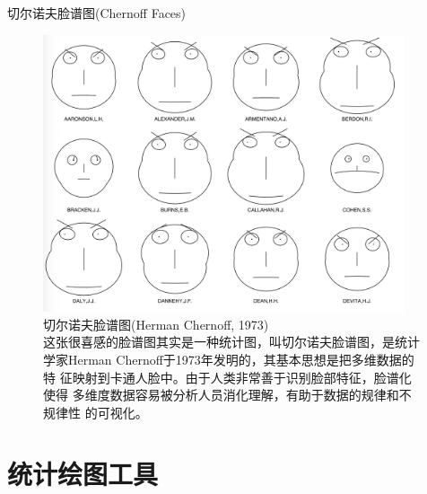 \documentclass{beamerthemeMono}
\begin{document}
\begin{frame}{\subsecname}{切尔诺夫脸谱图(Chernoff Faces)}

  \begin{figure}
    \begin{columns}
      \begin{column}{.6\textwidth}
        \includegraphics[width=\columnwidth]{切尔诺夫脸谱图.jpg}
      \end{column}

      \begin{column}{.35\textwidth}
        \centering
        \caption{切尔诺夫脸谱图(Herman Chernoff, 1973)\\
          这张很喜感的脸谱图其实是一种统计图，叫切尔诺夫脸谱图，是统计
          学家Herman Chernoff于1973年发明的，其基本思想是把多维数据的特
          征映射到卡通人脸中。由于人类非常善于识别脸部特征，脸谱化使得
          多维度数据容易被分析人员消化理解，有助于数据的规律和不规律性
          的可视化。}
      \end{column}
    \end{columns}
  \end{figure}

\end{frame}

\section{统计绘图工具}
\end{document}
